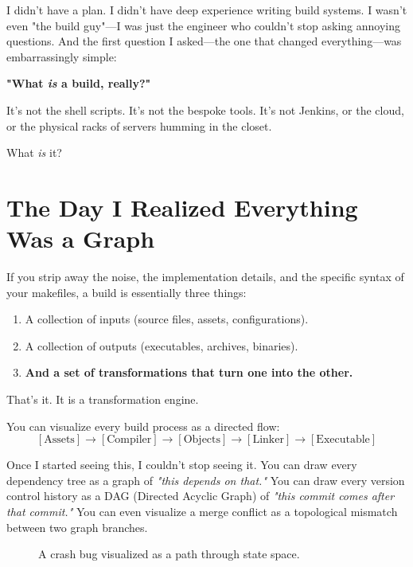 I didn't have a plan. I didn't have deep experience writing build systems. I wasn't even "the build guy"—I was just the engineer who couldn't stop asking annoying questions. And the first question I asked—the one that changed everything—was embarrassingly simple:

\textbf{"What \textit{is} a build, really?"}

It's not the shell scripts. It's not the bespoke tools. It's not Jenkins, or the cloud, or the physical racks of servers humming in the closet. 

What \textit{is} it?

\section{The Day I Realized Everything Was a Graph}
\label{sec:day-i-realized}

If you strip away the noise, the implementation details, and the specific syntax of your makefiles, a build is essentially three things:
\begin{enumerate}
    \item A collection of inputs (source files, assets, configurations).
    \item A collection of outputs (executables, archives, binaries).
    \item \textbf{And a set of transformations that turn one into the other.}
\end{enumerate}

That's it. It is a transformation engine.

You can visualize every build process as a directed flow:
\[
[\text{Assets}] \rightarrow [\text{Compiler}] \rightarrow [\text{Objects}] \rightarrow [\text{Linker}] \rightarrow [\text{Executable}]
\]

Once I started seeing this, I couldn't stop seeing it. You can draw every dependency tree as a graph of \textit{"this depends on that."} You can draw every version control history as a DAG (Directed Acyclic Graph) of \textit{"this commit comes after that commit."} You can even visualize a merge conflict as a topological mismatch between two graph branches.

\begin{figure}[h]
    \centering
    \caption{A crash bug visualized as a path through state space.}
    \label{fig:crash_path}
\end{figure}

